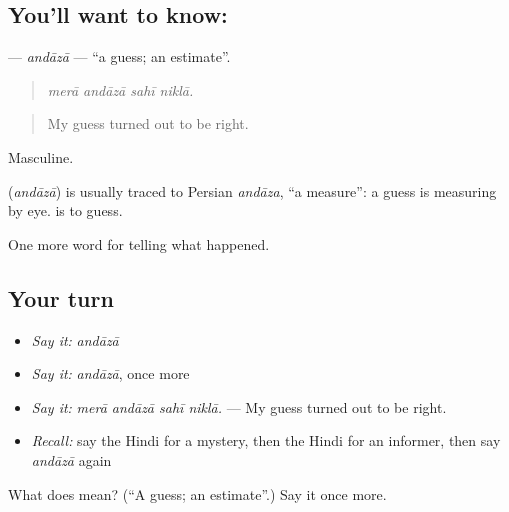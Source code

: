\subsection*{You'll want to know: }
\textbf{} — \emph{andāzā} — \textquotedblleft{}a guess; an estimate\textquotedblright{}.

\begin{quote}
   
\end{quote}

\begin{quote}
\emph{merā andāzā sahī niklā.}
\end{quote}

\begin{quote}
My guess turned out to be right.
\end{quote}

Masculine.

\begin{cousinweb}
\textbf{} (\emph{andāzā}) is usually traced to Persian \emph{andāza}, \textquotedblleft{}a measure\textquotedblright{}: a guess is measuring by eye. \textbf{ } is to guess.
\end{cousinweb}

\begin{grammarlens}[title={What you've built}]
One more word for telling what happened.
\end{grammarlens}

\subsection*{Your turn}
\begin{itemize}
\raggedright
  \item \emph{Say it:} \emph{andāzā}
  \item \emph{Say it:} \emph{andāzā}, once more
  \item \emph{Say it:} \emph{merā andāzā sahī niklā.} — My guess turned out to be right.
  \item \emph{Recall:} say the Hindi for a mystery, then the Hindi for an informer, then say \emph{andāzā} again
\end{itemize}

\begin{tcolorbox}[breakable,colback=teal!4,colframe=teal!35!black,title={Before you move on}]
What does  mean? (\textquotedblleft{}A guess; an estimate\textquotedblright{}.) Say it once more.
\end{tcolorbox}
